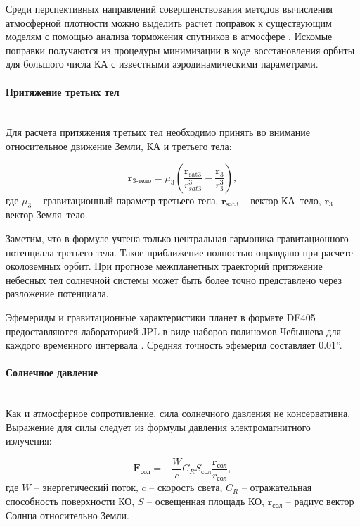 Среди перспективных направлений совершенствования методов вычисления атмосферной плотности 
можно выделить расчет поправок к существующим моделям с помощью анализа торможения спутников
в атмосфере \cite{cefola2003}. Искомые поправки получаются из процедуры минимизации в ходе
восстановления орбиты для большого числа КА с известными
аэродинамическими параметрами.

\paragraph{Притяжение третьих тел} \mbox{} \\

Для расчета притяжения третьих тел необходимо принять во внимание относительное движение
Земли, КА и третьего тела:

\begin{equation*}
    \ddot{\mathbf{r}}_{\text{3-тело}} = \mu_3 \left( \frac{\mathbf{r}_{\text{sat3}}}{r^3_{sat3}}
                                    - \frac{\mathbf{r}_{\text{3}}}{r^3_{3}} \right),
\end{equation*}
где $\mu_3$ -- гравитационный параметр третьего тела,
 $\mathbf{r}_{\text{sat3}}$ -- вектор КА--тело, 
 $\mathbf{r}_{3}$ -- вектор Земля--тело. 

Заметим, что в формуле учтена только центральная гармоника гравитационного потенциала третьего тела.
Такое приближение полностью оправдано при расчете околоземных орбит.
При прогнозе межпланетных траекторий притяжение небесных тел солнечной системы может быть 
более точно представлено через разложение потенциала.

Эфемериды и гравитационные характеристики планет в формате DE405 предоставляются лабораторией JPL в виде наборов полиномов Чебышева для
каждого временного интервала \cite{standish1998}. Средняя точность эфемерид составляет 0.01''.

\paragraph{Солнечное давление} \mbox{} \\

Как и атмосферное сопротивление, сила солнечного давления не консервативна. Выражение для силы следует из формулы давления
электромагнитного излучения:

\begin{equation*}
    \mathbf{F}_{\text{сол}} = -\frac{W}{c} C_R S_{\text{сол}} \frac{\mathbf{r}_{\text{сол}}}{r_{\text{сол}}},
\end{equation*}
где $W$ -- энергетический поток, $c$ -- скорость света,
$C_R$ -- отражательная способность поверхности КО,
$S$ -- освещенная площадь КО,
$\mathbf{r}_{\text{сол}}$ -- радиус вектор Солнца относительно Земли.

